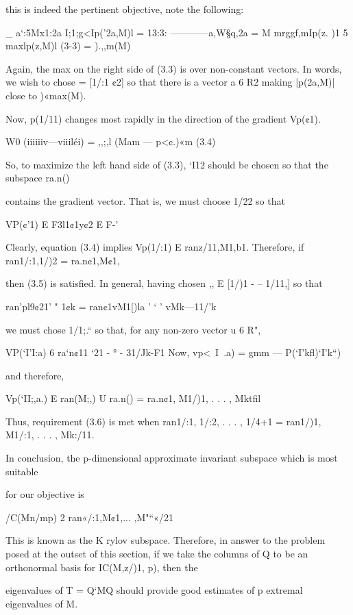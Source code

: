 this is indeed the pertinent objective, note the following:

   

_ a‘\1:5Mx1:2a
I;1;g<Ip(\I'2a,M)l = 13:3: ————a,W§q,2a
= M
mrggf,mIp(z. )1
5 maxlp(z,M)l (3-3)
= ).,,m(M)

Again, the max on the right side of (3.3) is over non-constant vectors. In words, we wish to chose
 = [1/:1 ¢2] so that there is a vector a 6 R2 making |p(\II2a,M)| close to )«max(M).

Now, p(1/11) changes most rapidly in the direction of the gradient Vp(¢1).

W0  (iiiiiiv---viiiléi)
= ,,;,l (Mam — p<¢.)«m (3.4)

So, to maximize the left hand side of (3.3), ‘I12 should be chosen so that the subspace ra.n()

contains the gradient vector. That is, we must choose 1/22 so that

VP(¢'1) E F3l1{¢1y¢2} E F-'%

Clearly, equation (3.4) implies Vp(1/:1) E ran{z/11,M1,b1}. Therefore, if ran{1/:1,1/)2} = ra.n{¢1,M¢1},

then (3.5) is satisﬁed.
In general, having chosen \II,, E [1/)1 - -- 1/11,] so that

ran{'pl9¢21' " 1¢k} = ran{¢1vM1[)la ' ‘ ' vMk—11/’k}

we must chose 1/1;.“ so that, for any non-zero vector u 6 R",

VP(‘I’I:a) 6 ra‘n{¢11 ‘21 - ° - 31/Jk-F1} 
Now,
vp<~I~.a) = gmm — P(‘I’kﬂ)‘I’k“)

and therefore,

Vp(‘II;,a.) E ran(M\II;,) U ra.n(\IIk) = ra.n{¢1, M1/)1, . . . , Mktﬁl}

Thus, requirement (3.6) is met when ran{1/:1, 1/:2, . . . , 1/4+1} = ran{1/)1, M1/:1, . . . , Mk:/11}.

In conclusion, the p-dimensional approximate invariant subspace which is most suitable

for our objective is

/C(Mn/mp) 2 ran{«/:1,M¢1,... ,M"“«/21}

This is known as the K rylov subspace. Therefore, in answer to the problem posed at the outset
of this section, if we take the columns of Q to be an orthonormal basis for IC(M,z/)1, p), then the

eigenvalues of T = Q‘MQ should provide good estimates of p extremal eigenvalues of M.

